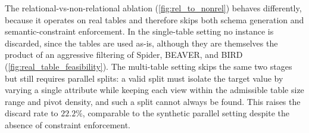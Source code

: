 The relational-vs-non-relational ablation (\autoref{fig:rel_to_nonrel})
behaves differently, because it operates on real tables and therefore
skips both schema generation and semantic-constraint enforcement. In the
single-table setting no instance is discarded, since the tables are used
as-is, although they are themselves the product of an aggressive
filtering of Spider, BEAVER, and BIRD
(\autoref{fig:real_table_feasibility}). The multi-table setting skips the
same two stages but still requires parallel splits: a valid split must
isolate the target value by varying a single attribute while keeping each
view within the admissible table size range and pivot density, and such a split cannot always be
found. This raises the discard rate to $22.2\%$, comparable to the
synthetic parallel setting despite the absence of constraint enforcement.



